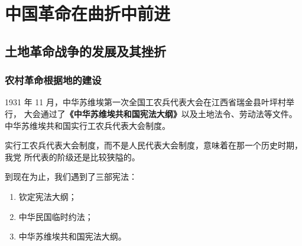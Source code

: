\documentclass[10pt, UTF8]{book} %
\begin{document}



\section{中国革命在曲折中前进}

\subsection{土地革命战争的发展及其挫折}

\subsubsection{农村革命根据地的建设}

1931 年 11 月，中华苏维埃第一次全国工农兵代表大会在江西省瑞金县叶坪村举行，
大会通过了\textbf{《中华苏维埃共和国宪法大纲》}以及土地法令、劳动法等文件。
中华苏维埃共和国实行工农兵代表大会制度。
\begin{remark}
    实行工农兵代表大会制度，而不是人民代表大会制度，意味着在那一个历史时期，我党
    所代表的阶级还是比较狭隘的。
\end{remark}

\begin{mdframed}[frametitle={《中国近现代史纲要》课程中出现的宪法}]
    到现在为止，我们遇到了三部宪法：
    \begin{enumerate}[label={\arabic*.}, itemsep=0pt]
        \item 钦定宪法大纲；
        \item 中华民国临时约法；
        \item 中华苏维埃共和国宪法大纲。
    \end{enumerate}
\end{mdframed}
\end{document}
